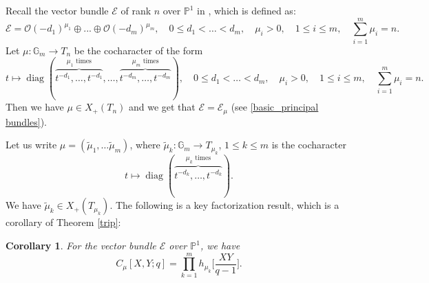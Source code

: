 \documentclass{amsart}
\newcommand{\cE}{\mathcal{E}}
\theoremstyle{plain}
\newtheorem{corollary}{Corollary}[theorem]
\theoremstyle{definition}
\theoremstyle{remark}
\DeclareMathOperator{\diag}{diag}
\begin{document}
Recall the vector bundle $
\cE$ of rank $n$ over $\mathbb{P}^1$ in \cite[Section 5.4]{Mel}, which is defined as:
\[
\cE=\mathcal{O}(-d_{1})^{\mu_{1}}\oplus...\oplus\mathcal{O}(-d_{m})^{\mu_{m}},\quad 0\leq d_{1}<\ldots<d_{m},\quad \mu_{i}>0,\quad 1\leq i\leq m, \quad \sum_{i=1}^{m}\mu_{i}=n.
\]
Let $\mu:\mathbb{G}_{m}\rightarrow T_{n}$ be the cocharacter of the form 
\[
t\mapsto\diag(\overbrace{t^{-d_{1}},\ldots,t^{-d_{1}}}^{\mu_{1}\text{ times}},\ldots,\overbrace{t^{-d_{m}},\ldots,t^{-d_{m}}}^{\mu_{m}\text{ times}}),\quad 0\leq d_{1}<\ldots<d_{m},\quad \mu_{i}>0,\quad 1\leq i\leq m, \quad \sum_{i=1}^{m}\mu_{i}=n.
\]
Then we have $\mu\in X_{+}(T_{n})$ and we get that $\cE=\cE_{\mu}$ (see \ref{basic_principal bundles}).

Let us write $\mu=(\widetilde{\mu}_{1},\ldots\widetilde{\mu}_{m})$, where $\widetilde{\mu}_{k}:\mathbb{G}_{m}\rightarrow T_{\mu_{k}}$, $1\leq k\leq m$ is the cocharacter
\[
t\mapsto\diag(\overbrace{t^{-d_{k}},\ldots,t^{-d_{k}}}^{\mu_{k}\text{ times}}).
\]
We have $\widetilde{\mu}_{k}\in X_{+}(T_{\mu_{k}})$. 
The following is a key factorization result, which is a corollary of Theorem \ref{trip}:
\begin{corollary}\label{factorization}
For the vector bundle $\cE$ over $\mathbb{P}^1$, we have 
\[
C_{\mu}[X,Y;q]=\prod_{k=1}^{m}h_{\mu_{k}}\bigg[\frac{XY}{q-1}\bigg].
\]
\end{corollary}
\end{document}
